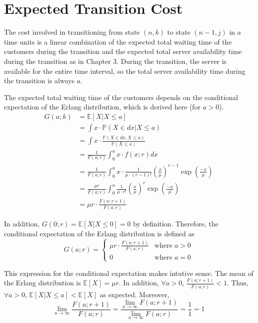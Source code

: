 \section{Expected Transition Cost}

The cost involved in transitioning from state $(n, k)$ to state $(n - 1, j)$ in $a$ time units is a linear combination of the expected total waiting time of the customers during the transition and the expected total server availability time during the transition as in Chapter 3. During the transition, the server is available for the entire time interval, so the total server availability time during the transition is always $a$.

The expected total waiting time of the customers depends on the conditional expectation of the Erlang distribution, which is derived here (for $a > 0$).
\begin{align*}
	G (a; k) & = \mathbb{E} [X | X \leq a] \\
	& = \int x \cdot \mathbb{P} (X \in dx | X \leq a) \\
	& = \int x \cdot \frac{\mathbb{P} (X \in dx, X \leq a)}{\mathbb{P} (X \leq a)} \\
	& = \frac{1}{F (a; r)} \int_{0}^{a} x \cdot f(x; r) dx \\
	& = \frac{1}{F (a; r)} \int_{0}^{a} x \cdot \frac{1}{\mu \cdot (r - 1)!} \left( \frac{x}{\mu} \right)^{r - 1} \exp \left( \frac{-x}{\mu} \right) \\
	& = \frac{\mu r}{F (a; r)} \int_{0}^{a} \frac{1}{\mu \cdot r!} \left( \frac{x}{\mu} \right)^{r} \exp \left( \frac{-x}{\mu} \right) \\
	& = \mu r \cdot \frac{F (a; r + 1)}{F (a; r)}
\end{align*}

In addition, $G (0; r) = \mathbb{E} [X | X \leq 0] = 0$ by definition. Therefore, the conditional expectation of the Erlang distribution is defined as
\begin{equation}
	G (a; r) = \begin{cases} \mu r \cdot \frac{F (a; r + 1)}{F (a; r)} & \text{where $a > 0$} \\ 0 & \text{where $a = 0$} \end{cases}
\end{equation}

This expression for the conditional expectation makes intutive sense. The mean of the Erlang distribution is $\mathbb{E} [X] = \mu r$. In addition, $\forall a > 0$, $\frac{F (a; r + 1)}{F (a; r)} < 1$. Thus, $\forall a > 0$, $\mathbb{E} [X | X \leq a] < \mathbb{E} [X]$ as expected. Moreover, 
\begin{equation}
	\lim_{a \to \infty} \frac{F (a; r + 1)}{F (a; r)} = \frac{\displaystyle \lim_{a \to \infty} F (a; r + 1)}{\displaystyle \lim_{a \to \infty} F (a; r)} = \frac{1}{1} = 1
\end{equation}


